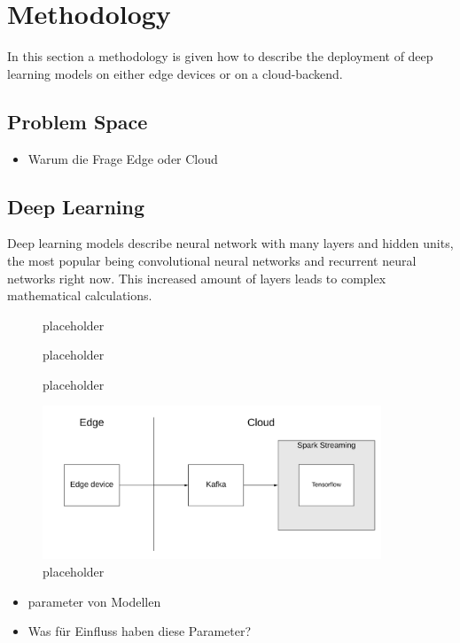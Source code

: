 \chapter{Methodology}
In this section a methodology is given how to describe the deployment of deep learning models on either edge devices or on a cloud-backend.
\section{Problem Space}
\begin{itemize}
    \item Warum die Frage Edge oder Cloud
\end{itemize}
\section{Deep Learning}
Deep learning models describe neural network with many layers and hidden units, the most popular being convolutional neural networks and recurrent neural networks right now. This increased amount of layers leads to complex mathematical calculations.

\begin{figure}[H]
\centering

\caption{placeholder}
\label{fig:cloud}
\end{figure}
\begin{figure}[H]
\centering

\caption{placeholder}
\label{fig:edge}
\end{figure}
\begin{figure}[H]
\centering

\caption{placeholder}
\label{fig:trade}
\end{figure}
\begin{figure}[H]
\centering
\includegraphics[width=0.9\textwidth]{./Bilder/spark_stream.png}
\caption{placeholder}
\label{fig:trade}
\end{figure}
\begin{itemize}
    \item parameter von Modellen
    \item Was für Einfluss haben diese Parameter?
\end{itemize}
